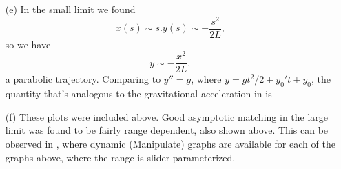 {\begin{enumerate}
In the small limit \(w << 1\) we also have \(w^2 \ll w\), so that
\begin{equation}\label{eqn:modernOpticsProblemSet1P2:630}
u(w)
\sim \ln( \sqrt{w} + 1)
\sim \sqrt{w} - \inv{2} (\sqrt{w})^2 + \inv{3}(\sqrt{w})^3 - \cdots
\sim \sqrt{w},
\end{equation}
%
or

A plot of \(x(y/L)/L\), and the small and large limit approximations can be found in \cref{fig:modernOpticsProblemSet1:modernOpticsProblemSet1Fig2d} and \cref{fig:modernOpticsProblemSet1:modernOpticsProblemSet1Fig2dBig}.
%
%
%
\item[(e)]
In the small limit we found
%
\begin{subequations}
\begin{equation}\label{eqn:modernOpticsProblemSet1P2:530}
x(s) \sim s.
\end{equation}
\begin{equation}\label{eqn:modernOpticsProblemSet1P2:550}
y(s) \sim -\frac{s^2}{2 L},
\end{equation}
\end{subequations}
%
so we have
%
\begin{equation}\label{eqn:modernOpticsProblemSet1P2:570}
y \sim -\frac{x^2}{2 L},
\end{equation}
%
a parabolic trajectory.  Comparing to \(y'' = g\), where \(y = g t^2/2 + y_0' t + y_0\), the quantity that's analogous to the gravitational acceleration in  is
\item[(f)]
These plots were included above.  Good asymptotic matching in the large limit was found to be fairly range dependent, also shown above.  This can be observed in , where dynamic (Manipulate) graphs are available for each of the graphs above, where the range is slider parameterized.
\end{enumerate}
} %
